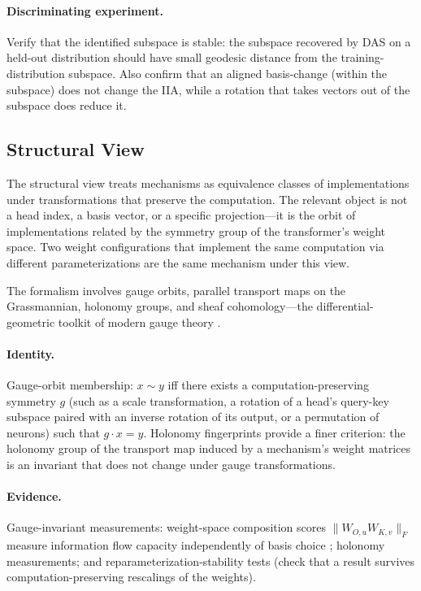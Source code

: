 \documentclass[11pt]{article}
\theoremstyle{remark}
\begin{document}
\paragraph{Discriminating experiment.}
Verify that the identified subspace is stable: the subspace recovered
by DAS on a held-out distribution should have small geodesic distance
from the training-distribution subspace.  Also confirm that
an aligned basis-change (within the subspace) does not change the IIA,
while a rotation that takes vectors out of the subspace does reduce it.

\subsection{Structural View}

The structural view treats mechanisms as equivalence classes of
implementations under transformations that preserve the computation.
The relevant object is not a head index, a basis vector, or a specific
projection---it is the orbit of implementations related by the symmetry
group of the transformer's weight space.  Two weight configurations
that implement the same computation via different parameterizations are
the same mechanism under this view.

The formalism involves gauge orbits, parallel transport maps on the
Grassmannian, holonomy groups, and sheaf cohomology---the differential-geometric
toolkit of modern gauge theory \citep{nakahara2003}.

\paragraph{Identity.}
Gauge-orbit membership: $x \sim y$ iff there exists a computation-preserving
symmetry $g$ (such as a scale transformation, a rotation of a head's
query-key subspace paired with an inverse rotation of its output, or a
permutation of neurons) such that $g \cdot x = y$.  Holonomy fingerprints
provide a finer criterion: the holonomy group of the transport map
induced by a mechanism's weight matrices is an invariant that does not
change under gauge transformations.

\paragraph{Evidence.}
Gauge-invariant measurements: weight-space composition scores
$\|W_{O,u} W_{K,v}\|_F$ measure information flow capacity independently
of basis choice \citep{elhage2021,merullo2024}; holonomy measurements; and
reparameterization-stability tests (check that a result survives
computation-preserving rescalings of the weights).
\end{document}
